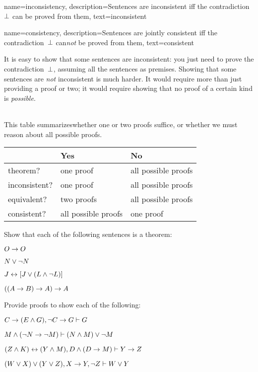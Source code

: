 {    name={inconsistency}, 
  description={Sentences are inconsistent iff the contradiction~$\bot$ can be proved from them},
    text={inconsistent}
}

{    name={consistency}, 
  description={Sentences are jointly consistent iff the contradiction~$\bot$ can\emph{not} be proved from them},
    text={consistent}
}

It is easy to show that some sentences are inconsistent: you just need
to prove the contradiction~$\bot$, assuming all the sentences as
premises. Showing that some sentences are \emph{not} inconsistent is much
harder. It would require more than just providing a proof or two; it
would require showing that no proof of a certain kind is
\emph{possible}.

\
\\
This table summarizeswhether one or two proofs suffice, or whether we must reason about all possible proofs.

\begin{center}
\begin{tabular}{l l l}
 & \textbf{Yes} & \textbf{No}\\
 \hline
theorem? & one proof & all possible proofs\\
inconsistent? &  one proof  & all possible proofs\\
equivalent? & two proofs & all possible proofs\\
consistent? & all possible proofs & one proof\\
\end{tabular}
\end{center}


\practiceproblems
\problempart
Show that each of the following sentences is a theorem:
\begin{earg}
\item $O \rightarrow O$
\item $N \vee \neg N$
\item $J \leftrightarrow [J\vee (L\wedge\neg L)]$
\item $((A \rightarrow B) \rightarrow A) \rightarrow A$ 
\end{earg}

\problempart
Provide proofs to show each of the following:
\begin{earg}
\item $C\rightarrow(E\wedge G), \neg C \rightarrow G \vdash G$
\item $M \wedge (\neg N \rightarrow \neg M) \vdash (N \wedge M) \vee \neg M$
\item $(Z\wedge K)\leftrightarrow(Y\wedge M), D\wedge(D\rightarrow M) \vdash Y\rightarrow Z$
\item $(W \vee X) \vee (Y \vee Z), X\rightarrow Y, \neg Z \vdash W\vee Y$
\end{earg}

